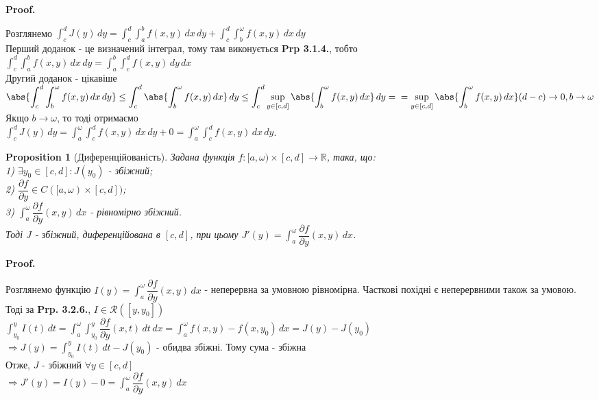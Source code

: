 \documentclass[a4paper, 10pt]{article}
\makeatletter
\def\departial#1#2{\dfrac{\partial {#1}}{\partial {#2}}}
\def\huge{\displaystyle}
\def\qed{$\blacksquare$}
\theoremstyle{theoremdd}
\theoremstyle{theoremdd}
\theoremstyle{theoremdd}
\theoremstyle{theoremdd}
\theoremstyle{theoremdd}
\theoremstyle{theoremdd}
\newtheorem{proposition}[theorem]{Proposition}
\theoremstyle{theoremdd}
\theoremstyle{theoremdd}
\theoremstyle{theoremdd}
\renewenvironment{proof}[1][Proof.\\]{\par
\pushQED{\hfill \qed}%
\normalfont \topsep6\p@\@plus6\p@\relax
\trivlist
\item\relax
{\bfseries
#1\@addpunct{.}}\hspace\labelsep\ignorespaces
}{%
\popQED\endtrivlist\@endpefalse
}
\makeatother
\begin{document}
\begin{proof}
Розглянемо $\huge \int_c^d J(y)\,dy = \int_c^d \int_a^b f(x,y)\,dx\,dy + \int_c^d \int_b^\omega f(x,y)\,dx\,dy$\\
Перший доданок - це визначений інтеграл, тому там виконується \textbf{Prp 3.1.4.}, тобто\\
$\huge \int_c^d \int_a^b f(x,y)\,dx\,dy = \int_a^b \int_c^d f(x,y)\,dy\,dx$\\
Другий доданок - цікавіше\\
$\huge \abs{\int_c^d \int_b^\omega f(x,y)\,dx\,dy} \leq \int_c^d \abs{\int_b^\omega f(x,y)\,dx}\,dy \leq \int_c^d \sup_{y \in [c,d]} \abs{\int_b^\omega f(x,y)\,dx}\,dy = \\ = \sup_{y \in [c,d]} \abs{\int_b^\omega f(x,y)\,dx} (d-c) \to 0, b \to \omega$\\
Якщо $b \to \omega$, то тоді отримаємо\\
$\huge \int_c^d J(y)\,dy = \huge \int_a^\omega \int_c^d f(x,y)\,dx\,dy + 0 = \huge \int_a^\omega \int_c^d f(x,y)\,dx\,dy$.
\end{proof}

\begin{proposition}[Диференційованість]
Задана функція $f: [a,\omega) \times [c,d] \to \mathbb{R}$, така, що:\\
1) $\exists y_0 \in [c,d]: J(y_0)$ - збіжний;\\
2) $\departial{f}{y} \in C([a,\omega) \times [c,d])$;\\
3) $\huge \int_a^\omega \departial{f}{y}(x,y)\,dx$ - рівномірно збіжний.\\
Тоді $J$ - збіжний, диференційована в $[c,d]$, при цьому $J'(y) = \huge \int_a^\omega \departial{f}{y}(x,y)\,dx$.
\end{proposition}

\begin{proof}
Розглянемо функцію $I(y) = \huge \int_a^\omega \departial{f}{y}(x,y)\,dx$ - неперервна за умовною рівномірна. Часткові похідні є неперервними також за умовою. Тоді за \textbf{Prp. 3.2.6.}, $I \in \mathcal{R}([y,y_0])$\\
$\huge \int_{y_0}^y I(t)\,dt = \huge \int_a^\omega \int_{y_0}^y \departial{f}{y}(x,t)\,dt\,dx = \int_a^\omega f(x,y)-f(x,y_0)\,dx = J(y) - J(y_0)$\\
$\Rightarrow J(y) = \huge \int_{y_0}^y I(t)\,dt - J(y_0)$ - обидва збіжні. Тому сума - збіжна\\
Отже, $J$ - збіжний $\forall y \in [c,d]$\\
$\Rightarrow J'(y) = I(y) - 0 = \huge \int_a^\omega \departial{f}{y}(x,y)\,dx$
\end{proof}
\end{document}
